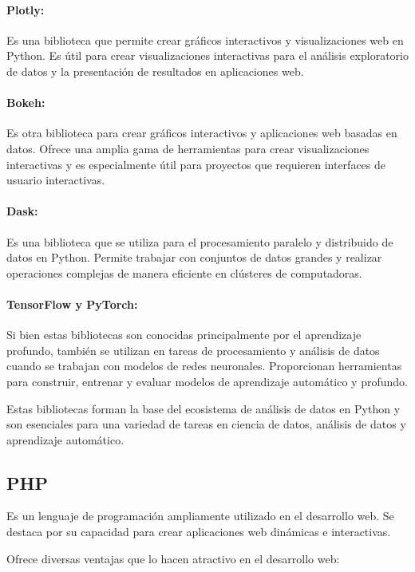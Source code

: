 \paragraph{Plotly:}
Es una biblioteca que permite crear gráficos interactivos y visualizaciones web en Python. Es útil para crear visualizaciones interactivas para el análisis exploratorio de datos y la presentación de resultados en aplicaciones web.

\paragraph{Bokeh:}
Es otra biblioteca para crear gráficos interactivos y aplicaciones web basadas en datos. Ofrece una amplia gama de herramientas para crear visualizaciones interactivas y es especialmente útil para proyectos que requieren interfaces de usuario interactivas.

\paragraph{Dask:}
Es una biblioteca que se utiliza para el procesamiento paralelo y distribuido de datos en Python. Permite trabajar con conjuntos de datos grandes y realizar operaciones complejas de manera eficiente en clústeres de computadoras.

\paragraph{TensorFlow y PyTorch:}
Si bien estas bibliotecas son conocidas principalmente por el aprendizaje profundo, también se utilizan en tareas de procesamiento y análisis de datos cuando se trabajan con modelos de redes neuronales. Proporcionan herramientas para construir, entrenar y evaluar modelos de aprendizaje automático y profundo.

Estas bibliotecas forman la base del ecosistema de análisis de datos en Python y son esenciales para una variedad de tareas en ciencia de datos, análisis de datos y aprendizaje automático.

\subsection{PHP}
Es un lenguaje de programación ampliamente utilizado en el desarrollo web. Se destaca por su capacidad para crear aplicaciones web dinámicas e interactivas\cite{cobo2005php}.

Ofrece diversas ventajas que lo hacen atractivo en el desarrollo web:

